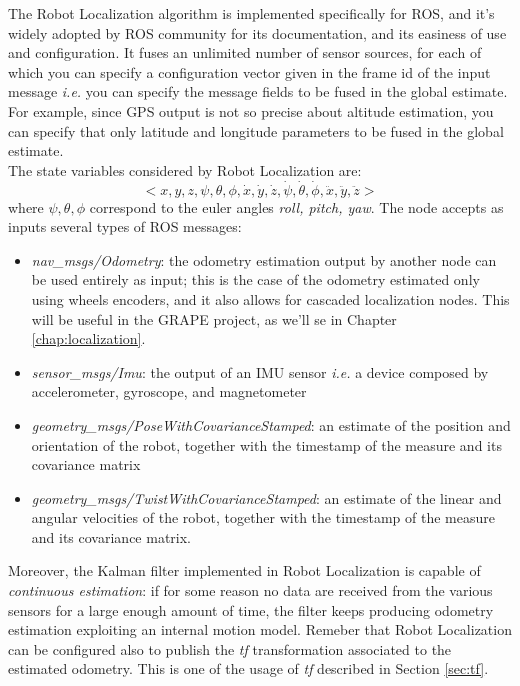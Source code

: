 The Robot Localization algorithm is implemented specifically for \ac{ROS}, and it's widely adopted by \ac{ROS} community for its documentation, and its easiness of use and configuration. It fuses an unlimited number of sensor sources, for each of which you can specify a configuration vector given in the frame id of the input message \textit{i.e.} you can specify the message fields to be fused in the global estimate. For example, since GPS output is not so precise about altitude estimation, you can specify that only latitude and longitude parameters to be fused in the global estimate. \\

The state variables considered by Robot Localization are:
\begin{equation}
	<x, y, z, \psi, \theta, \phi, \dot{x}, \dot{y}, \dot{z},\dot{\psi}, \dot{\theta}, \dot{\phi}, \ddot{x}, \ddot{y}, \ddot{z}>
	\label{eq:robotLocalizationState}
\end{equation}
where $ \psi, \theta, \phi$ correspond to the euler angles \textit{roll, pitch, yaw}. 
The node accepts as inputs several types of \ac{ROS} messages:
\begin{itemize}
	\item \textit{nav\_msgs/Odometry}: the odometry estimation output by another node can be used entirely as input; this is the case of the odometry estimated only using wheels encoders, and it also allows for cascaded localization nodes. This will be useful in the \ac{GRAPE} project, as we'll se in Chapter \ref{chap:localization}.
	\item \textit{sensor\_msgs/Imu}: the output of an \ac{IMU} sensor \textit{i.e.} a device composed by accelerometer, gyroscope, and magnetometer
	\item \textit{geometry\_msgs/PoseWithCovarianceStamped}: an estimate of the position and orientation of the robot, together with the timestamp of the measure and its covariance matrix
	\item \textit{geometry\_msgs/TwistWithCovarianceStamped}: an estimate of the linear and angular velocities of the robot, together with the timestamp of the measure and its covariance matrix.
\end{itemize}
Moreover, the Kalman filter implemented in Robot Localization is capable of \textit{continuous estimation}: if for some reason no data are received from the various sensors for a large enough amount of time, the filter keeps producing odometry estimation exploiting an internal motion model. 
Remeber that Robot Localization can be configured also to publish the \textit{tf} transformation associated to the estimated odometry. This is one of the usage of \textit{tf} described in Section \ref{sec:tf}.

